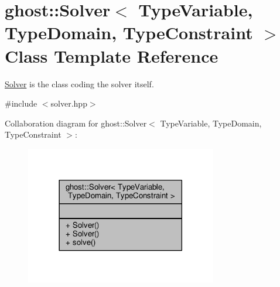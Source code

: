 \hypertarget{classghost_1_1Solver}{}\section{ghost\+:\+:Solver$<$ Type\+Variable, Type\+Domain, Type\+Constraint $>$ Class Template Reference}
\label{classghost_1_1Solver}


\hyperlink{classghost_1_1Solver}{Solver} is the class coding the solver itself.  




{\ttfamily \#include $<$solver.\+hpp$>$}



Collaboration diagram for ghost\+:\+:Solver$<$ Type\+Variable, Type\+Domain, Type\+Constraint $>$\+:
\nopagebreak
\begin{figure}[H]
\begin{center}
\leavevmode
\includegraphics[width=237pt]{classghost_1_1Solver__coll__graph}
\end{center}
\end{figure}
